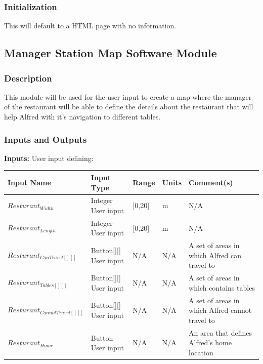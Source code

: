 \documentclass [10pt]{article}
\begin{document}
\subsubsection{Initialization}
This will default to a HTML page with no information.


\subsection{Manager Station Map Software Module}


\subsubsection{Description}
This module will be used for the user input to create a map where the manager of the restaurant will be able to define the details about the restaurant that will help Alfred with it's navigation to different tables.


\subsubsection{Inputs and Outputs}

\textbf{Inputs:} User input defining:\\

\begin{longtable}{| p{} | p{} | p{} | p{} | p{} |}\hline 
	\rowcolor{tableCell}\textbf{Input Name} & \textbf{Input Type} & \textbf{Range} & \textbf{Units} & \textbf{Comment(s)} \\ \hline
	$ Resturant_{Width} $ & Integer User input &  [0,20] & m &  N/A\\ \hline
	\rowcolor{tableCell}$ Resturant_{Length} $ & Integer User input &  [0,20] & m &  N/A\\ \hline
	$ Resturant_{CanTravel[][]} $ & Button[][] User input &  N/A & N/A & A set of areas in which Alfred can travel to \\ \hline
	\rowcolor{tableCell}$ Resturant_{Tables[][]} $ & Button[][] User input &  N/A & N/A & A set of areas in which contains tables \\ \hline
	$ Resturant_{CannotTravel[][]} $ & Button[][] User input &  N/A & N/A & A set of areas in which Alfred cannot travel to \\ \hline
	\rowcolor{tableCell}$ Resturant_{Home} $ & Button User input &  N/A & N/A & An area that defines Alfred's home location \\ \hline
\end{longtable}
\end{document}
